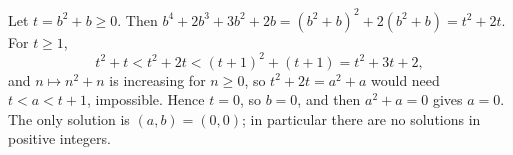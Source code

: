 Let $t=b^2+b\ge0$. Then $b^4+2b^3+3b^2+2b=(b^2+b)^2+2(b^2+b)=t^2+2t$. For $t\ge1$,
\[t^2+t<t^2+2t<(t+1)^2+(t+1)=t^2+3t+2,\]
and $n\mapsto n^2+n$ is increasing for $n\ge0$, so $t^2+2t=a^2+a$ would need $t<a<t+1$, impossible. Hence $t=0$, so $b=0$, and then $a^2+a=0$ gives $a=0$. The only solution is $\boxed{(a,b)=(0,0)}$; in particular there are no solutions in positive integers.
